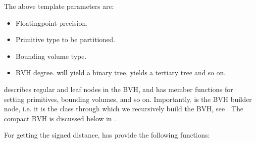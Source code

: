 \documentclass[letterpaper,10pt,english]{sphinxmanual}
\begin{document}
\sphinxAtStartPar
The above template parameters are:
\begin{itemize}
\item {} 
\sphinxAtStartPar
{} Floating\sphinxhyphen{}point precision.

\item {} 
\sphinxAtStartPar
{} Primitive type to be partitioned.

\item {} 
\sphinxAtStartPar
{} Bounding volume type.

\item {} 
\sphinxAtStartPar
{} BVH degree.  will yield a binary tree,  yields a tertiary tree and so on.

\end{itemize}

\sphinxAtStartPar
{} describes regular and leaf nodes in the BVH, and has member functions for setting primitives, bounding volumes, and so on.
Importantly,  is the BVH builder node, i.e. it is the class through which we recursively build the BVH, see {\hyperref[\detokenize{ImplemBVH:chap-bvhconstruction}]{}}.
The compact BVH is discussed below in {\hyperref[\detokenize{ImplemBVH:chap-linearbvh}]{}}.

\sphinxAtStartPar
For getting the signed distance,  has provide the following functions:

\begin{sphinxVerbatim}[commandchars=\\\{\}]
 
     

 
       
\end{sphinxVerbatim}
\end{document}
